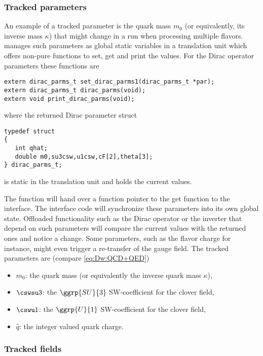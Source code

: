 \subsubsection{Tracked parameters}

An example of a tracked parameter is the quark mass $m_0$ (or equivalently, its inverse mass $\kappa$) that might change in a run when processing multiple flavors. \Openqxd manages such parameters as global static variables in a translation unit which offers non-pure functions to set, get and print the values. For the Dirac operator parameters these functions are
\begin{verbatim}
extern dirac_parms_t set_dirac_parms1(dirac_parms_t *par);
extern dirac_parms_t dirac_parms(void);
extern void print_dirac_parms(void);
\end{verbatim}
where the returned Dirac parameter struct
\begin{verbatim}
typedef struct
{
   int qhat;
   double m0,su3csw,u1csw,cF[2],theta[3];
} dirac_parms_t;
\end{verbatim}
is static in the translation unit and holds the current values.

The  function will hand over a function pointer to the get function  to the interface.
The interface code will synchronize these parameters into its own global state.
Offloaded functionality such as the Dirac operator or the inverter that depend on such parameters will compare the current values with the returned ones and notice a change.
Some parameters, such as the flavor charge  for instance, might even trigger a re-transfer of the gauge field.
The tracked parameters are (compare \cref{eq:Dw:QCD+QED})
\begin{itemize}
  \item $m_0$: the quark mass (or equivalently the inverse quark mass $\kappa$),
  \item $\cswsu3$: the $\ggrp{SU}{3}$ SW-coefficient for the clover field,
  \item $\cswu1$: the $\ggrp{U}{1}$ SW-coefficient for the clover field,
  \item $\hat{q}$: the integer valued quark charge.
\end{itemize}

\subsubsection{Tracked fields}

